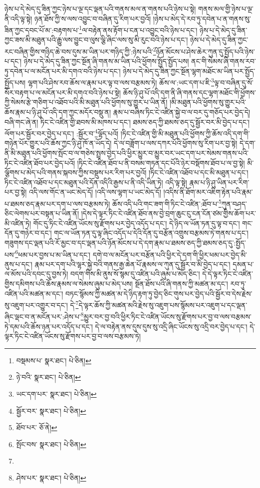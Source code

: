 ཉེས་པ་དེ་མེད་དུ་ཟིན་ཀྱང་ཉེས་པ་ལྔ་དང་ལྡན་པའི་གནས་མལ་ན་གནས་པའི་ཉེས་པ་སྟེ། གནས་མལ་གྱི་ཉེས་པ་ལྔ་ནི་འདི་ལྟ་སྟེ། ཉན་ཐོས་ཀྱི་ས་ལས་འབྱུང་བ་བཞིན་དུ་རིག་པར་བྱའོ། །ཉེས་པ་མེད་དེ་རབ་ཏུ་དབེན་པ་ན་གནས་སུ་ཟིན་ཀྱང་དབང་པོ་མ་:བརྟགས་པ་\footnote{བསྡམས་པ་  སྣར་ཐང་།  པེ་ཅིན། }ལ་བརྟེན་ནས་རྟོག་པ་ངན་པ་འབྱུང་བའི་ཉེས་པ་དང་། ཉེས་པ་དེ་མེད་དུ་ཟིན་ཀྱང་ཟས་མི་མཐུན་པའི་རྒྱུ་ལས་བྱུང་བ་ལུས་ལྕི་ཞིང་ལས་སུ་མི་རུང་བའི་ཉེས་པ་དང་། ཉེས་པ་དེ་མེད་དུ་ཟིན་ཀྱང་རང་བཞིན་གྱིས་གཉིད་ཆེ་བས་དུས་མ་ཡིན་པར་གཉིད་ཀྱི་:ཉེས་པའི་\footnote{ཉེ་བའི་  སྣར་ཐང་།  པེ་ཅིན། }ཉོན་མོངས་པ་ཤེས་ཆེར་ཀུན་དུ་སྤྱོད་པའི་ཉེས་པ་དང་། ཉེས་པ་དེ་མེད་དུ་ཟིན་ཀྱང་སྔོན་ཞི་གནས་མ་ཡིན་པའི་ཕྱོགས་སྤྱོད་སྤྱོད་པས། ནང་གི་སེམས་ཞི་གནས་རབ་ཏུ་དབེན་པ་ལ་མངོན་པར་མི་དགའ་བའི་ཉེས་པ་དང་། ཉེས་པ་དེ་མེད་དུ་ཟིན་ཀྱང་སྔོན་ལྷག་མཐོང་མ་ཡིན་པར་སྤྱོད་སྤྱོད་པས། ལྷག་པའི་ཤེས་རབ་ཆོས་ལ་རྣམ་པར་ལྟ་བ་ལས་བརྩམས་ཏེ། ཆོས་ལ་:ཡང་དག་པ་ཇི་\footnote{ཡང་དག་པར་  སྣར་ཐང་།  པེ་ཅིན། }ལྟ་བ་བཞིན་དུ་སོ་སོར་བརྟག་པ་ལ་མངོན་པར་མི་དགའ་བའི་ཉེས་པ་སྟེ། ཆོས་ཉི་ཤུ་པོ་འདི་དག་ནི་ཞི་གནས་དང་ལྷག་མཐོང་གི་ཕྱོགས་ཀྱི་སེམས་རྩེ་གཅིག་པ་འཐོབ་པའི་མི་མཐུན་པའི་ཕྱོགས་སུ་གྱུར་པ་ཡིན་ནོ། །མི་མཐུན་པའི་ཕྱོགས་སུ་གྱུར་པའི་ཆོས་རྣམ་པ་ཉི་ཤུ་པོ་འདི་དག་ཀྱང་མདོར་བསྡུ་ན། རྣམ་པ་བཞིས་ཏིང་ངེ་འཛིན་སྐྱེ་བ་ལ་བར་དུ་གཅོད་པར་བྱེད་དེ། བཞི་གང་ཞེ་ན། ཏིང་ངེ་འཛིན་གྱི་ཐབས་མི་མཁས་པ་དང་། ཐམས་ཅད་ཀྱི་ཐམས་ཅད་དུ་སྦྱོར་བར་མི་བྱེད་པ་དང་། ལོག་པར་སྦྱོར་བར་བྱེད་པ་དང་། :སྦྱོར་བ་\footnote{སྦྱོར་བར་  སྣར་ཐང་།  པེ་ཅིན། }ལྷོད་པའོ། །ཏིང་ངེ་འཛིན་གྱི་མི་མཐུན་པའི་ཕྱོགས་ཀྱི་ཆོས་འདི་དག་གི་གཉེན་པོར་གྱུར་པའི་ཆོས་ཀྱང་ཉི་ཤུ་ཁོ་ན་ཡོད་དེ། དེ་ལ་བཟློག་པ་ལས་དཀར་པོའི་ཕྱོགས་སུ་རིག་པར་བྱ་སྟེ། དེ་དག་ནི་མི་མཐུན་པའི་ཕྱོགས་སྤོང་བ་ལ་གཅེས་སྤྲས་བྱེད་པའི་ཕྱིར་མྱུར་བ་མྱུར་བར་ཡང་དག་པར་སེམས་གནས་པའི་ཏིང་ངེ་འཛིན་ཐོབ་པར་བྱེད་པའོ། །ཏིང་ངེ་འཛིན་ཐོབ་པ་ནི་བསམ་གཏན་དང་པོའི་ཉེར་བསྡོགས་ཐོབ་པ་ལ་བྱ་སྟེ། མི་ལྕོགས་པ་མེད་པའི་གནས་སྐབས་ཀྱིས་བསྡུས་པར་རིག་པར་བྱའོ། །ཏིང་ངེ་འཛིན་འཐོབ་པ་དང་མི་མཐུན་པ་དང་། ཏིང་ངེ་འཛིན་འཐོབ་པ་དང་མཐུན་པའི་དོན་འདིའི་རྒྱས་པ་ནི་འདི་ཡིན་ཏེ། འདི་ལྟ་སྟེ། རྣམ་པ་ཉི་ཤུ་ཡིན་པར་རིག་པར་བྱ་སྟེ། འདི་ལས་གོང་ན་ཡང་མེད་དོ། །འདི་ལས་ལྷག་པ་ཡང་མེད་དོ། །འདིས་ནི་ཐོག་མར་འཇིག་རྟེན་པའི་རྣམ་པ་ཐམས་ཅད་རྣམ་པར་དག་པ་ལས་བརྩམས་ཏེ། ཆོས་འདི་པའི་གང་ཟག་གི་ཏིང་ངེ་འཛིན་:ཐོབ་པ་\footnote{ཐོབ་པར་  ཅོ་ནེ། }ཀུན་བཤད་ཅིང་ལེགས་པར་བསྟན་པ་ཡིན་ནོ། །དེས་དེ་ལྟར་ཏིང་ངེ་འཛིན་ཐོབ་ནས་བྱེ་བྲག་ཆུང་ངུ་ངན་ངོན་ཙམ་གྱིས་ཆོག་པར་མི་འཛིན་ཏེ། གོང་དུ་ཏིང་ངེ་འཛིན་ཡོངས་སུ་རྫོགས་པར་བྱེད་འདོད་པ་དང་། དེ་ཉིད་ལ་ཡོན་ཏན་དུ་ལྟ་བ་དང་། གང་དོན་དུ་གཉེར་བ་དང་། གང་ལ་ཡོན་ཏན་དུ་ལྟ་ཞིང་འདོད་པ་དེའི་དོན་དུ་བརྩོན་འགྲུས་བརྩམས་ཏེ་གནས་པ་དང་། གཟུགས་དང་ལྡན་པའི་རོ་མྱང་བ་དང་ལྡན་པའི་ཉོན་མོངས་པ་དེ་དག་རྣམ་པ་ཐམས་ཅད་ཀྱི་ཐམས་ཅད་དུ་:སྤྱོད་པས་\footnote{སྤོང་བས་  སྣར་ཐང་།  པེ་ཅིན། }ཕམ་པར་བྱས་པ་མ་ཡིན་པ་དང་། དགེ་བ་ལ་མངོན་པར་བརྩོན་པའི་ཕྱིར་དེ་དག་གི་ཕྱིར་ཕམ་པར་བྱེད་མི་ནུས་པ་དང་། རྣམ་པར་དག་པའི་ལྷར་སྐྱེ་བའི་གནས་རྒྱ་ཆེན་པོ་རྣམས་ལ་ཀུན་དུ་སྦྱོར་བ་མི་བྱེད་པ་དང་། དམན་པ་ལ་མོས་པའི་དབང་དུ་བྱས་ཏེ། བདག་གིས་མི་ནུས་སོ་སྙམ་དུ་འཛིན་པའི་ཞུམ་པ་མེད་ཅིང་། དེ་དེ་ལྟར་ཏིང་ངེ་འཛིན་གྱིས་དམིགས་པའི་ཆོས་རྣམས་ལ་སེམས་ཞུམ་པ་མེད་པས། སྔོན་ཐོས་པའི་ཞི་གནས་ཀྱི་མཚན་མ་དང་། རབ་ཏུ་འཛིན་པའི་མཚན་མ་དང་། བཏང་སྙོམས་ཀྱི་མཚན་མ་དེ་ཉིད་རྟག་ཏུ་བྱེད་ཅིང་གུས་པར་བྱེད་པའི་སྦྱོར་བ་དེས་རྗེས་སུ་འཇུག་པར་འགྱུར་བ་དང་། དེ་\footnote{}དེ་ལྟར་ཆོས་ཀྱི་མཚན་མའི་རྗེས་སུ་འཇུག་པས་སྙོམས་པར་འཇུག་པ་དང་ལྡན་ཞིང་ལྡང་བ་ན་མངོན་པར་:ཤེས་པ་\footnote{ཤེས་པར་  སྣར་ཐང་།  པེ་ཅིན། }མྱུར་བར་བྱ་བའི་ཕྱིར་ཏིང་ངེ་འཛིན་ཡོངས་སུ་རྫོགས་པར་བྱ་བ་ལས་བརྩམས་ཏེ་དམ་པའི་ཆོས་ཉན་པར་འདོད་པ་དང་། དེ་ལ་བརྟེན་ནས་དུས་དུས་སུ་འདྲི་ཞིང་ཡོངས་སུ་འདྲི་བར་བྱེད་པ་དང་། དེ་ལྟར་ཏིང་ངེ་འཛིན་ཡོངས་སུ་རྫོགས་པར་བྱ་བ་ལས་བརྩམས་ཏེ། 